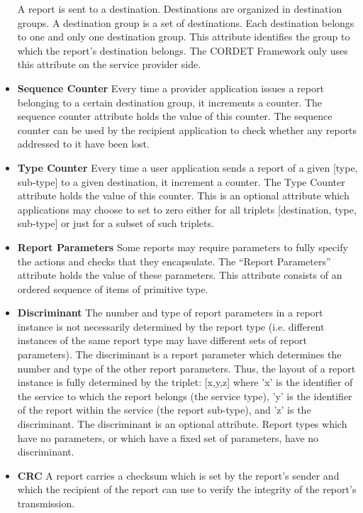 \begin{itemize}
A report is sent to a destination. Destinations are organized in destination groups. A destination group is a set of destinations. Each destination belongs to one and only one destination group. This attribute identifies the group to which the report's destination belongs. The CORDET Framework only uses this attribute on the service provider side.
\item \textbf{Sequence Counter}
Every time a provider application issues a report belonging to a certain destination group, it increments a counter. The sequence counter attribute holds the value of this counter. The sequence counter can be used by the recipient application to check whether any reports addressed to it have been lost. 
\item \textbf{Type Counter}
Every time a user application sends a report of a given [type, sub-type] to a given destination, it increment a counter. The Type Counter attribute holds the value of this counter. This is an optional attribute which applications may choose to set to zero either for all triplets [destination, type, sub-type] or just for a subset of such triplets.
\item \textbf{Report Parameters}
Some reports may require parameters to fully specify the actions and checks that they encapsulate. The “Report Parameters” attribute holds the value of these parameters. This attribute consists of an ordered sequence of items of primitive type. 
\item \textbf{Discriminant}
The number and type of report parameters in a report instance is not necessarily determined by the report type (i.e. different instances of the same report type may have different sets of report parameters). The discriminant is a report parameter which determines the number and type of the other report parameters. Thus, the layout of a report instance is fully determined by the triplet: [x,y,z] where 'x' is the identifier of the service to which the report belongs (the service type), 'y' is the identifier of the report within the service (the report sub-type), and 'z' is the discriminant.  The discriminant is an optional attribute. Report types which have no parameters, or which have a fixed set of parameters, have no discriminant.
\item \textbf{CRC}
A report carries a checksum which is set by the report's sender and which the recipient of the report can use to verify the integrity of the report's transmission. 

\end{itemize}


